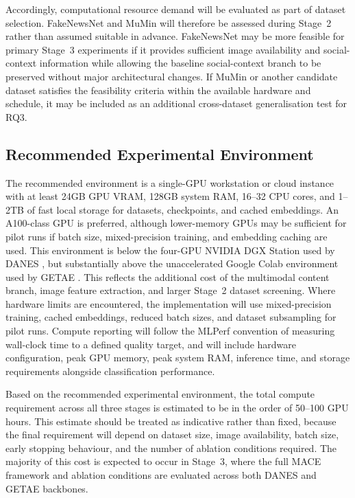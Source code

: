 Accordingly, computational resource demand will be evaluated as part of dataset selection. FakeNewsNet and MuMin will therefore be assessed during Stage~2 rather than assumed suitable in advance. FakeNewsNet may be more feasible for primary Stage~3 experiments if it provides sufficient image availability and social-context information while allowing the baseline social-context branch to be preserved without major architectural changes. If MuMin or another candidate dataset satisfies the feasibility criteria within the available hardware and schedule, it may be included as an additional cross-dataset generalisation test for RQ3.

\subsection{Recommended Experimental Environment}
\label{sec:environment}

The recommended environment is a single-GPU workstation or cloud instance with at least 24GB GPU VRAM, 128GB system RAM, 16--32 CPU cores, and 1--2TB of fast local storage for datasets, checkpoints, and cached embeddings. An A100-class GPU is preferred, although lower-memory GPUs may be sufficient for pilot runs if batch size, mixed-precision training, and embedding caching are used. This environment is below the four-GPU NVIDIA DGX Station used by DANES \citep{truica2024danes}, but substantially above the unaccelerated Google Colab environment used by GETAE \citep{GETAE2025}. This reflects the additional cost of the multimodal content branch, image feature extraction, and larger Stage~2 dataset screening. Where hardware limits are encountered, the implementation will use mixed-precision training, cached embeddings, reduced batch sizes, and dataset subsampling for pilot runs. Compute reporting will follow the MLPerf convention of measuring wall-clock time to a defined quality target, and will include hardware configuration, peak GPU memory, peak system RAM, inference time, and storage requirements alongside classification performance.

Based on the recommended experimental environment, the total compute requirement across all three stages is estimated to be in the order of 50--100 GPU hours. This estimate should be treated as indicative rather than fixed, because the final requirement will depend on dataset size, image availability, batch size, early stopping behaviour, and the number of ablation conditions required. The majority of this cost is expected to occur in Stage~3, where the full MACE framework and ablation conditions are evaluated across both DANES and GETAE backbones.

